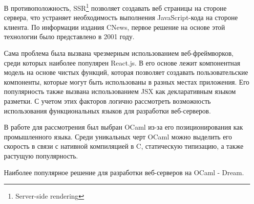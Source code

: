В противоположность, SSR\footnote{Server-side rendering} позволяет создавать веб страницы на стороне сервера, что устраняет необходимость выполнения JavaScript-кода на стороне клиента. %
По информации издания CNews, первое решение на основе этой технологии было представлено в 2001 году. %


Сама проблема была вызвана чрезмерным использованием веб-фреймворков, среди которых наиболее популярен React.js. %
В его основе лежит компонентная модель на основе чистых функций, которая позволяет создавать пользовательские компоненты, которые могут быть использованы в разных местах приложения. %
Его популярность также вызвана использованием JSX как декларативным языком разметки. %
С учетом этих факторов логично рассмотреть возможность использования функциональных языков для разработки веб-серверов. 

В работе для рассмотрения был выбран OCaml из-за его позиционирования как промышленного языка.
Среди уникальных черт OCaml можно выделить его скорость в связи с нативной компиляцией в C, статическую типизацию, а также растущую популярность. %

Наиболее популярное решение для разработки веб-серверов на OCaml - Dream. %

